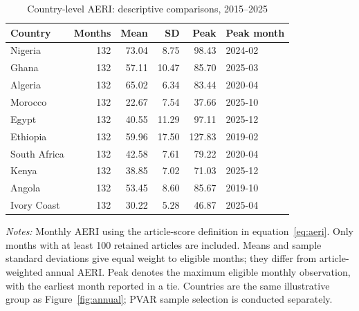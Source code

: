 \begin{table}[htbp]\centering\small\singlespacing
\caption{Country-level AERI: descriptive comparisons, 2015--2025}\label{tab:country_aeri}
\begin{tabular}{lrrrrl}\toprule
Country & Months & Mean & SD & Peak & Peak month\\\midrule
Nigeria & 132 & 73.04 & 8.75 & 98.43 & 2024-02\\
Ghana & 132 & 57.11 & 10.47 & 85.70 & 2025-03\\
Algeria & 132 & 65.02 & 6.34 & 83.44 & 2020-04\\
Morocco & 132 & 22.67 & 7.54 & 37.66 & 2025-10\\
Egypt & 132 & 40.55 & 11.29 & 97.11 & 2025-12\\
Ethiopia & 132 & 59.96 & 17.50 & 127.83 & 2019-02\\
South Africa & 132 & 42.58 & 7.61 & 79.22 & 2020-04\\
Kenya & 132 & 38.85 & 7.02 & 71.03 & 2025-12\\
Angola & 132 & 53.45 & 8.60 & 85.67 & 2019-10\\
Ivory Coast & 132 & 30.22 & 5.28 & 46.87 & 2025-04\\
\bottomrule\end{tabular}
\par\medskip\raggedright\footnotesize\textit{Notes:} Monthly AERI using the article-score definition in equation~\eqref{eq:aeri}. Only months with at least 100 retained articles are included. Means and sample standard deviations give equal weight to eligible months; they differ from article-weighted annual AERI. Peak denotes the maximum eligible monthly observation, with the earliest month reported in a tie. Countries are the same illustrative group as Figure~\ref{fig:annual}; PVAR sample selection is conducted separately.
\end{table}